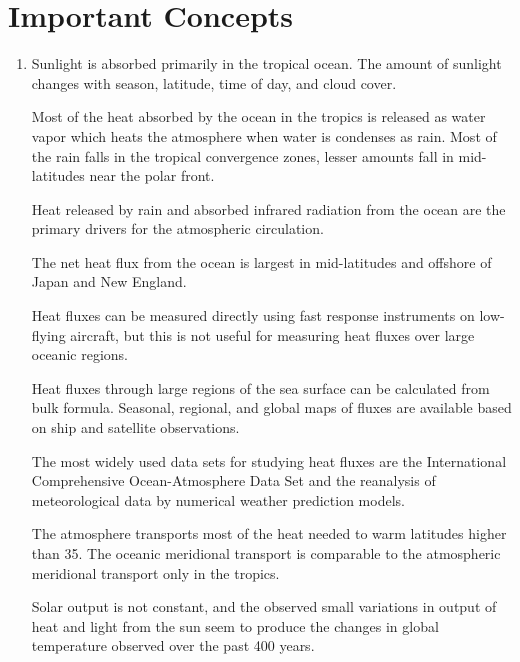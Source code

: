 \section{Important Concepts}
\begin{enumerate}
\item Sunlight is absorbed primarily in the tropical ocean. The amount of
sunlight changes with season, latitude, time of day, and cloud cover.

\vitem Most of the heat absorbed by the ocean in the tropics is released as water
vapor which heats the atmosphere when water is condenses as rain. Most of the
rain falls in the tropical convergence zones, lesser amounts fall in
mid-latitudes near the polar front.

\vitem Heat released by rain and absorbed infrared radiation from the ocean are
the primary drivers for the atmospheric circulation.

\vitem The net heat flux from the ocean is largest in mid-latitudes and
offshore of Japan and New England.

\vitem Heat fluxes can be measured directly using fast response instruments on
low-flying aircraft, but this is not useful for measuring heat fluxes over large oceanic regions.

\vitem Heat fluxes through large regions of the sea surface can be calculated
from bulk formula. Seasonal, regional, and global maps of fluxes are
available based on ship and satellite observations.

\vitem The most widely used data sets for studying heat fluxes are the International Comprehensive Ocean-Atmosphere Data Set and the reanalysis of
meteorological data by numerical weather prediction models.

\vitem The atmosphere transports most of the heat needed to warm
latitudes higher than 35\degrees. The oceanic meridional transport is comparable to the
atmospheric meridional transport only in the tropics.

\vitem Solar output is not constant, and the observed small variations in
output of heat and light from the sun seem to produce the changes in
global temperature observed over the past 400 years.
\end{enumerate}


